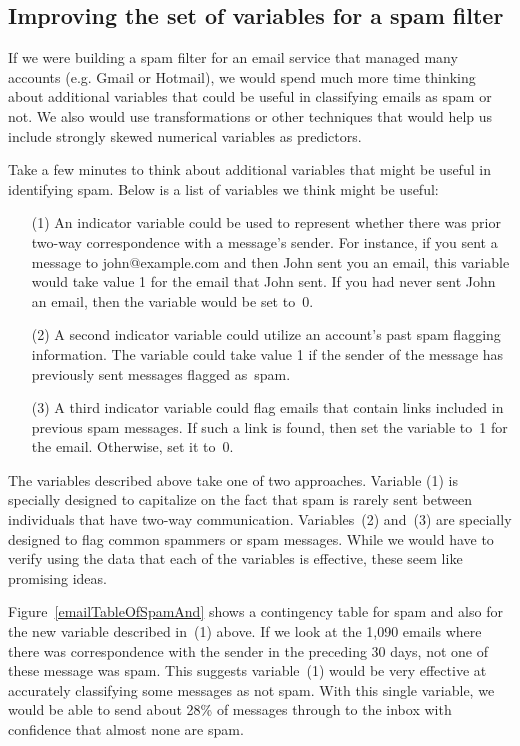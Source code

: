\subsection{Improving the set of variables for a spam filter}
\label{improvingTheSetOfVariablesForASpamFilter}

If we were building a spam filter for an email service that managed many accounts (e.g. Gmail or Hotmail), we would spend much more time thinking about additional variables that could be useful in classifying emails as spam or not. We also would use transformations or other techniques that would help us include strongly skewed numerical variables as predictors.

Take a few minutes to think about additional variables that might be useful in identifying spam. Below is a list of variables we think might be useful:
\begin{enumerate}
\item[(1)] An indicator variable could be used to represent whether there was prior two-way correspondence with a message's sender. For instance, if you sent a message to john@example.com and then John sent you an email, this variable would take value 1 for the email that John sent. If you had never sent John an email, then the variable would be set to~0.
\item[(2)] A second indicator variable could utilize an account's past spam flagging information. The variable could take value 1 if the sender of the message has previously sent messages flagged as~spam.
\item[(3)] A third indicator variable could flag emails that contain links included in previous spam messages. If such a link is found, then set the variable to~1 for the email. Otherwise, set it to~0.
\end{enumerate}
The variables described above take one of two approaches. Variable (1) is specially designed to capitalize on the fact that spam is rarely sent between individuals that have two-way communication. Variables~(2) and~(3) are specially designed to flag common spammers or spam messages. While we would have to verify using the data that each of the variables is effective, these seem like promising ideas.

Figure~\ref{emailTableOfSpamAnd} shows a contingency table for spam and also for the new variable described in~(1) above. If we look at the 1,090 emails where there was correspondence with the sender in the preceding 30 days, not one of these message was spam. This suggests variable~(1) would be very effective at accurately classifying some messages as not spam. With this single variable, we would be able to send about 28\% of messages through to the inbox with confidence that almost none are spam.

